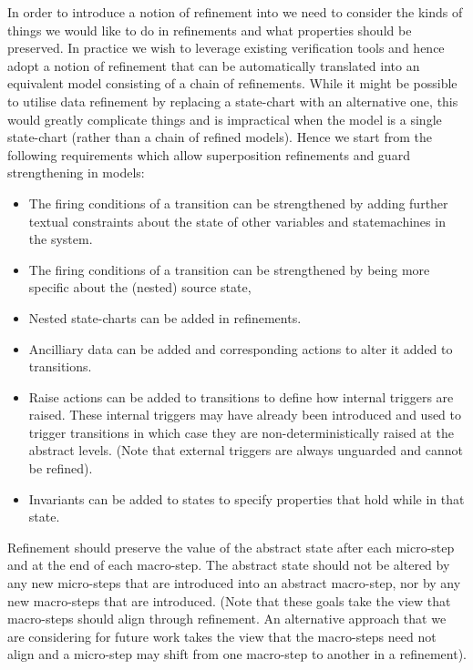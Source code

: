 In order to introduce a notion of refinement into \SCXML we need to consider the kinds of things we would like to do in refinements and what properties should be preserved.
In practice we wish to leverage existing \EventB verification tools and hence adopt a notion of refinement that can be automatically translated into an equivalent \EventB model consisting of a chain of refinements. While it might be possible to utilise data refinement by replacing a state-chart with an alternative one, this would greatly complicate things and is impractical when the \SCXML model is a single state-chart (rather than a chain of refined models). Hence we start from the following requirements which allow superposition refinements and guard strengthening in \SCXML models:
\begin{itemize}
	\item The firing conditions of a transition can be strengthened by adding further textual constraints about the state of other variables and statemachines in the system.
	\item The firing conditions of a transition can be strengthened by being more specific about the (nested) source state,
	\item Nested state-charts can be added in refinements.
	\item Ancilliary data can be added and corresponding actions to alter it added to transitions.
	\item Raise actions can be added to transitions to define how internal triggers are raised. These internal triggers may have already been introduced and used to trigger transitions in which case they are non-deterministically raised at the abstract levels. (Note that external triggers are always unguarded and cannot be refined).
	\item Invariants can be added to states to specify properties that hold while in that state.
\end{itemize}

Refinement should preserve the value of the abstract state after each micro-step and at the end of each macro-step. The abstract state should not be altered by any new micro-steps that are introduced into an abstract macro-step, nor by any new macro-steps that are introduced. (Note that these goals take the view that macro-steps should align through refinement. An alternative approach that we are considering for future work takes the view that the macro-steps need not align and a micro-step may shift from one macro-step to another in a refinement). 


